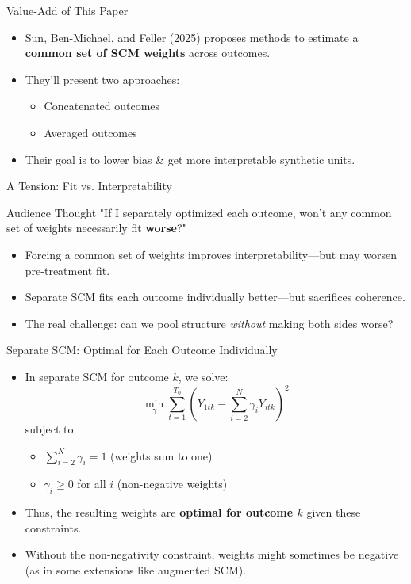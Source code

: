 \documentclass{beamer}
\begin{document}
\begin{frame}{Value-Add of This Paper}
  \begin{itemize}
    \item Sun, Ben-Michael, and Feller (2025) proposes methods to estimate a \textbf{common set of SCM weights} across outcomes.
    \item They'll present two approaches:
    \begin{itemize}
      \item Concatenated outcomes
      \item Averaged outcomes
    \end{itemize}
    \item Their goal is to lower bias \& get more interpretable synthetic units.
  \end{itemize}
\end{frame}

\begin{frame}{A Tension: Fit vs. Interpretability}
  \begin{block}{Audience Thought}
    \centering
    \large
    "If I separately optimized each outcome, won't any common set of weights necessarily fit \textbf{worse}?"
  \end{block}
  \vspace{0.5cm}
  \begin{itemize}
    \item Forcing a common set of weights improves interpretability—but may worsen pre-treatment fit.
    \item Separate SCM fits each outcome individually better—but sacrifices coherence.
    \item The real challenge: can we pool structure \textit{without} making both sides worse?
  \end{itemize}
\end{frame}


\begin{frame}{Separate SCM: Optimal for Each Outcome Individually}
  \begin{itemize}
    \item In separate SCM for outcome $k$, we solve:
    \[
    \min_{\gamma} \sum_{t=1}^{T_0} \left( Y_{1tk} - \sum_{i=2}^N \gamma_i Y_{itk} \right)^2
    \]
    subject to:
    \begin{itemize}
      \item $\sum_{i=2}^N \gamma_i = 1$ (weights sum to one)
      \item $\gamma_i \geq 0$ for all $i$ (non-negative weights)
    \end{itemize}
    \item Thus, the resulting weights are \textbf{optimal for outcome $k$} given these constraints.
    \item Without the non-negativity constraint, weights might sometimes be negative (as in some extensions like augmented SCM).
  \end{itemize}
\end{frame}
\end{document}
